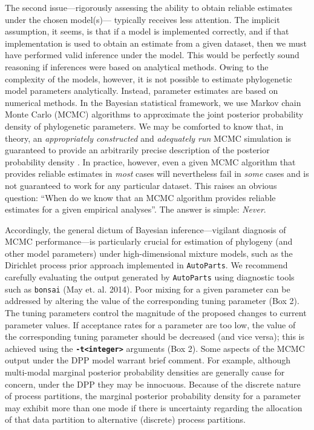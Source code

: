 \documentclass[11pt]{article}
\newcommand{\cl}[1]{{\texttt{\textbf{#1}}}}
\begin{document}
The second issue---rigorously assessing the ability to obtain reliable estimates under the chosen model(s)--- typically receives less attention. 
The implicit assumption, it seems, is that if a model is implemented correctly, and if that implementation is used to obtain an estimate from a given dataset, then we must have performed valid inference under the model. 
This would be perfectly sound reasoning if inferences were based on analytical methods. 
Owing to the complexity of the models, however, it is not possible to estimate phylogenetic model parameters analytically. 
Instead, parameter estimates are based on numerical methods. 
In the Bayesian statistical framework, we use Markov chain Monte Carlo (MCMC) algorithms to approximate the joint posterior probability density of phylogenetic parameters. 
We may be comforted to know that, in theory, an \emph{appropriately constructed} and \emph{adequately run} MCMC simulation is guaranteed to provide an arbitrarily precise description of the posterior probability density \citep[][]{tierney94}.
In practice, however, even a given MCMC algorithm that provides reliable estimates in \emph{most} cases will nevertheless fail in \emph{some} cases and is not guaranteed to work for any particular dataset. 
This raises an obvious question: “When do we know that an MCMC algorithm provides reliable estimates for a given empirical analyses”. 
The answer is simple: \emph{Never}. \vspace{-1.7mm}

Accordingly, the general dictum of Bayesian inference---vigilant diagnosis of MCMC performance---is particularly crucial for estimation of phylogeny (and other model parameters) under high-dimensional mixture models, such as the Dirichlet process prior approach implemented in \verb!AutoParts!. 
We recommend carefully evaluating the output generated by \verb!AutoParts! using diagnostic tools such as \verb!bonsai! (May et. al. 2014). 
Poor mixing for a given parameter can be addressed by altering the value of the corresponding tuning parameter (Box 2). 
The tuning parameters control the magnitude of the proposed changes to current parameter values. 
If acceptance rates for a parameter are too low, the value of the corresponding tuning parameter should be decreased (and vice versa); this is achieved using the \cl{-t<integer>} arguments (Box 2). 
Some aspects of the MCMC output under the DPP model warrant brief comment. 
For example, although multi-modal marginal posterior probability densities are generally cause for concern, under the DPP they may be innocuous. 
Because of the discrete nature of process partitions, the marginal posterior probability density for a parameter may exhibit more than one mode if there is uncertainty regarding the allocation of that data partition to alternative (discrete) process partitions. \vspace{-1.7mm}
\end{document}
